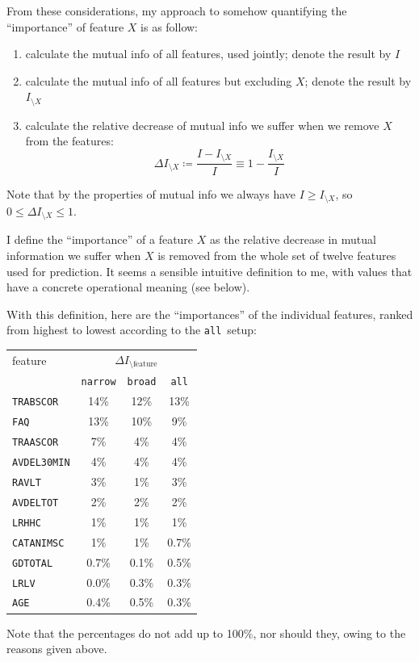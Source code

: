 \documentclass[\ifafour a4paper,12pt,\else a5paper,10pt,\fi%
onecolumn,oneside,article,%
british%
]{memoir}
\theoremstyle{remark}
\theoremstyle{innote}
\newcommand*{\defd}{\coloneqq}
\renewcommand*{\le}{\leqslant}%
\renewcommand*{\ge}{\geqslant}%
\renewcommand*{\|}[1][]{\nonscript\:#1\vert\nonscript\:\mathopen{}}
\newcommand*{\narrow}{\texttt{narrow}}
\newcommand*{\broad}{\texttt{broad}}
\newcommand*{\all}{\texttt{all}}
\newcommand*{\IX}{I_{\setminus X}}
\begin{document}
\bigskip

From these considerations, my approach to somehow quantifying the
\enquote{importance} of feature $X$ is as follow:
\begin{enumerate}
\item calculate the mutual info of all features, used jointly; denote the
  result by $I$
\item calculate the mutual info of all features but excluding $X$; denote
  the result by $\IX$
\item calculate the relative decrease of mutual info we suffer when we
  remove $X$ from the features:
  \begin{equation}
    \label{eq:rel_decrease_MI_X}
    \Delta\IX \defd  \frac{I - \IX}{I}
    \equiv 1-\frac{\IX}{I}
  \end{equation}
\end{enumerate}
Note that by the properties of mutual info we always have $I \ge
\IX$, so $0 \le \Delta\IX \le 1$.

I define the \enquote{importance} of a feature $X$ as the relative decrease
in mutual information we suffer when $X$ is removed from the whole set of
twelve features used for prediction. It seems a sensible intuitive definition to
me, with values that have a concrete operational meaning (see below).

With this definition, here are the \enquote{importances} of the individual features,
ranked from highest to lowest according to the \all\ setup:
\begin{center}
  \begin{tabular}[c]{l|ccc}
    feature &\multicolumn{3}{c}{$\Delta I_{\setminus\text{feature}}$} \\
    & \narrow & \broad & \all \\
\hline
\texttt{TRABSCOR} & 14\% & 12\% & 13\%\\
\texttt{FAQ} & 13\% & 10\% & 9\%\\
\texttt{TRAASCOR} & 7\% & 4\% & 4\%\\
\texttt{AVDEL30MIN} & 4\% & 4\% & 4\%\\
\texttt{RAVLT} & 3\% & 1\% & 3\%\\
\texttt{AVDELTOT} & 2\% & 2\% & 2\%\\
\texttt{LRHHC} & 1\% & 1\% & 1\%\\
\texttt{CATANIMSC} & 1\% & 1\% & 0.7\%\\
\texttt{GDTOTAL} & 0.7\% & 0.1\% & 0.5\%\\
\texttt{LRLV} & 0.0\% & 0.3\% & 0.3\%\\
\texttt{AGE} & 0.4\% & 0.5\% & 0.3\%
  \end{tabular}
\end{center}
Note that the percentages do not add up to 100\%, nor should they, owing to
the reasons given above.
\end{document}

